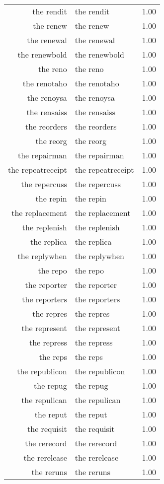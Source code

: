 \begin{table}[ht]
\begin{tabular}{rlr}
  the rendit & the rendit & 1.00 \\ 
  the renew & the renew & 1.00 \\ 
  the renewal & the renewal & 1.00 \\ 
  the renewbold & the renewbold & 1.00 \\ 
  the reno & the reno & 1.00 \\ 
  the renotaho & the renotaho & 1.00 \\ 
  the renoysa & the renoysa & 1.00 \\ 
  the rensaiss & the rensaiss & 1.00 \\ 
  the reorders & the reorders & 1.00 \\ 
  the reorg & the reorg & 1.00 \\ 
  the repairman & the repairman & 1.00 \\ 
  the repeatreceipt & the repeatreceipt & 1.00 \\ 
  the repercuss & the repercuss & 1.00 \\ 
  the repin & the repin & 1.00 \\ 
  the replacement & the replacement & 1.00 \\ 
  the replenish & the replenish & 1.00 \\ 
  the replica & the replica & 1.00 \\ 
  the replywhen & the replywhen & 1.00 \\ 
  the repo & the repo & 1.00 \\ 
  the reporter & the reporter & 1.00 \\ 
  the reporters & the reporters & 1.00 \\ 
  the repres & the repres & 1.00 \\ 
  the represent & the represent & 1.00 \\ 
  the repress & the repress & 1.00 \\ 
  the reps & the reps & 1.00 \\ 
  the republicon & the republicon & 1.00 \\ 
  the repug & the repug & 1.00 \\ 
  the repulican & the repulican & 1.00 \\ 
  the reput & the reput & 1.00 \\ 
  the requisit & the requisit & 1.00 \\ 
  the rerecord & the rerecord & 1.00 \\ 
  the rerelease & the rerelease & 1.00 \\ 
  the reruns & the reruns & 1.00 \\ 

\end{tabular}
\end{table}
